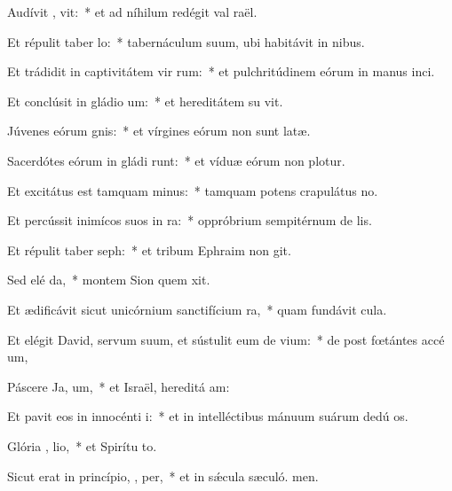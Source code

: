 \item Audívit ,  vit:~* et ad níhilum redégit val raël.
\item Et répulit taber lo:~* tabernáculum suum, ubi habitávit in nibus.
\item Et trádidit in captivitátem vir rum:~* et pulchritúdinem eórum in manus inci.
\item Et conclúsit in gládio  um:~* et hereditátem su vit.
\item Júvenes eórum  gnis:~* et vírgines eórum non sunt latæ.
\item Sacerdótes eórum in gládi runt:~* et víduæ eórum non plotur.
\item Et excitátus est tamquam  minus:~* tamquam potens crapulátus  no.
\item Et percússit inimícos suos in ra:~* oppróbrium sempitérnum de lis.
\item Et répulit taber seph:~* et tribum Ephraim non git.
\item Sed elé  da,~* montem Sion quem xit.
\item Et ædificávit sicut unicórnium sanctifícium   ra,~* quam fundávit  cula.
\item Et elégit David, servum suum, et sústulit eum de  vium:~* de post fœtántes accé um,
\item Páscere Ja,  um,~* et Israël, hereditá am:
\item Et pavit eos in innocénti  i:~* et in intelléctibus mánuum suárum dedú os.
\item Glória ,  lio,~* et Spirítu to.
\item Sicut erat in princípio,  ,  per,~* et in sǽcula sæculó. men.
